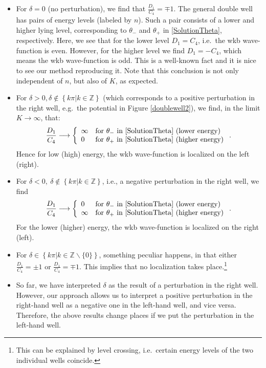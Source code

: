 \documentclass[12pt]{article}
\begin{document}
\begin{itemize}
\item For $\delta=0$ (no perturbation), we find that $\frac{D_1}{C_4}=\mp 1$. 
The general double well has pairs of energy levels (labeled by $n$). 
Such a pair consists of a lower and higher lying level, corresponding to $\theta_-$ and $\theta_+$ in \eqref{SolutionTheta}, respectively.
Here, we see that for the lower level $D_1=C_4$, i.e.\ the {\sc wkb} wave-function is even.
However, for the higher level we find $D_1=-C_4$, which means the {\sc wkb} wave-function is odd.
This is a well-known fact and it is nice to see our method reproducing it.
Note that this conclusion is not only independent of $n$, but also of $K$, as expected.
\item For $\delta>0,\delta\notin\left\{k\pi|k\in\mathbb{Z}\right\}$ (which corresponds to a positive perturbation in the right well, e.g.\ the potential in Figure \ref{doublewell2}), we find, in the limit $K\rightarrow\infty$, that:
\begin{equation*}
\frac{D_1}{C_4}\longrightarrow\left\{\begin{array}{ll}
\infty & \mbox{for $\theta_-$ in \eqref{SolutionTheta} (lower energy)}\\
 0 & \mbox{for $\theta_+$ in \eqref{SolutionTheta} (higher energy)}
\end{array}\right. .
\end{equation*}
Hence for low (high) energy, the {\sc wkb} wave-function is localized on the left (right).
\item For $\delta<0,\ \delta\notin\left\{k\pi|k\in\mathbb{Z}\right\}$, i.e., a negative perturbation in the right well, we find
\begin{equation*}
\frac{D_1}{C_4}\longrightarrow\left\{\begin{array}{ll}
0 & \mbox{for $\theta_-$ in \eqref{SolutionTheta} (lower energy)}\\
\infty & \mbox{for $\theta_+$ in \eqref{SolutionTheta} (higher energy)}
\end{array}\right. .
\end{equation*} 
 For the lower (higher) energy, the {\sc wkb} wave-function is localized on the right (left).
\item For $\delta\in\left\{k\pi|k\in\mathbb{Z}\backslash\{0\}\right\}$, something peculiar happens, in that either $\frac{D_1}{C_4}=\pm 1$ or $\frac{D_1}{C_4}=\mp 1$. This implies that no localization takes place.\footnote{This can be explained by level crossing, i.e.\ certain energy levels of the two individual wells coincide.}

\item So far, we have interpreted $\delta$ as the result of a perturbation in the right well.
However, our approach  allows us to interpret a positive perturbation in the right-hand well as a negative one in the left-hand well, and vice versa. Therefore, the above results change places if we put the perturbation in the left-hand well.
\end{itemize}
\end{document}
